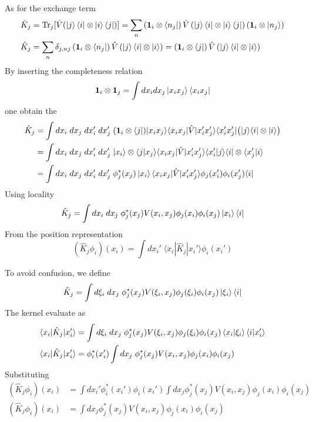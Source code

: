 \documentclass[../../../main.tex]{subfiles}
\begin{document}
As for the exchange term
\begin{align*}
  \hat{K }_j & =  \mathrm{Tr}_j[\hat{V}(\ket{j} \bra{i} \otimes \ket{i}\bra{j})]
  = \sum_n \left( \mathbf{1 }_i \otimes \bra{n_j} \right) \hat{V } \left( \ket{j }\bra{i }\otimes \ket{i }\bra{j } \right) \left( \mathbf{1 }_i \otimes \ket{n_j} \right) \\
  \hat{K }_j
             & =  \sum_n \delta_{j,nj}\left( \mathbf{1 }_i \otimes \bra{n_j} \right) \hat{V } \left( \ket{j }\bra{i }\otimes \ket{i }\right)
  =  \left( \mathbf{1 }_i \otimes \bra{j} \right) \hat{V } \left( \ket{j }\bra{i }\otimes \ket{i }\right)
\end{align*}
By inserting the completeness relation
\begin{equation*}
  \mathbf{1}_i\otimes \mathbf{1}_j = \int dx_idx_j\ket{x_i x_j} \bra{x_i x_j}
\end{equation*}
one obtain the
\begin{align*}
  \hat{K }_{j}
   & =   \int dx_i\;dx_j\;dx_i'\;dx_j'\;(\mathbf{1}_i\otimes\langle j|)|x_i x_j\rangle\langle x_i x_j|\hat{ V}|x_i' x_j'\rangle\langle x_i' x_j'|\big(|j\rangle\langle i|\otimes|i\rangle\big)        \\
   & =   \int dx_i\;dx_j\;dx_i'\;dx_j'\;\lvert x_i \rangle \otimes \langle j \rvert x_j \rangle \langle x_i x_j|\hat{ V}|x_i' x_j'\rangle \langle x_i'|j\rangle\langle i|\otimes\langle x_j'|i\rangle \\
   & =   \int dx_i\;dx_j\;dx_i'\;dx_j'\;\phi_j ^*(x_j) \ket{x_i}\langle x_i x_j|\hat{ V}|x_i' x_j'\rangle \phi_j(x_i')\phi_i(x_j')\langle i|
\end{align*}
Using locality
\begin{equation*}
  \hat{K }_{j}
  =   \int dx_i\;dx_j\; \phi_j ^*(x_j) V(x_i,x_j) \phi_j(x_i)\phi_i(x_j)\ket{x_i} \bra{i}
\end{equation*}
From the position representation
\begin{equation*}
  (\hat{K}_j\phi_i)(x_i) = \int dx_i'\;\langle x_i|\hat{K}_j|x_i'\rangle\phi_i(x_i')
\end{equation*}

To avoid confusion, we define
\begin{equation*}
  \hat{K }_{j}
  =   \int d\xi_i\;dx_j\; \phi_j ^*(x_j) V(\xi_i,x_j) \phi_j(\xi_i)\phi_i(x_j)\ket{\xi_i} \bra{i}
\end{equation*}
The kernel evaluate as
\begin{align*}
  \langle x_i|\hat{K}_j|x_i'\rangle
   & =    \int d\xi_i\;dx_j\; \phi_j ^*(x_j) V(\xi_i,x_j) \phi_j(\xi_i)\phi_i(x_j)\braket{x_i  | \xi_i} \braket{i  | x_i'} \\
  \langle x_i|\hat{K}_j|x_i'\rangle
   & = \phi_i ^*(x_i')\int dx_j\; \phi_j ^*(x_j) V(x_i,x_j) \phi_j(x_i)\phi_i(x_j)
\end{align*}
Substituting
\begin{align*}
  (\hat{K}_j\phi_i)(x_i) & = \int dx_i' \phi_i^*(x_i') \phi_i(x_i') \int dx_j \phi_j^*(x_j) V(x_i,x_j) \phi_j(x_i) \phi_i(x_j) \\
  (\hat{K}_j\phi_i)(x_i) & = \int dx_j \phi_j^*(x_j) V(x_i,x_j) \phi_j(x_i) \phi_i(x_j)
\end{align*}
\end{document}
